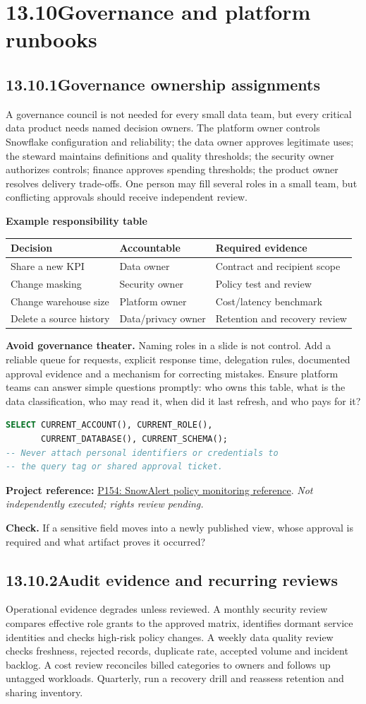\documentclass[11pt,twoside]{article}
\newcommand{\topic}[2]{\subsection*{#1\quad #2}}
\newcommand{\repo}[2]{\par\begingroup\fontsize{8.0}{9.6}\selectfont\sffamily\color{inkgray}\textbf{Project reference:} \href{#2}{#1}. \textit{Not independently executed; rights review pending.}\par\endgroup}
\begin{document}
\section*{13.10\quad Governance and platform runbooks}
\topic{13.10.1}{Governance ownership assignments}
A governance council is not needed for every small data team, but every critical data product needs named decision owners. The platform owner controls Snowflake configuration and reliability; the data owner approves legitimate uses; the steward maintains definitions and quality thresholds; the security owner authorizes controls; finance approves spending thresholds; the product owner resolves delivery trade-offs. One person may fill several roles in a small team, but conflicting approvals should receive independent review.
\begin{whitebox}\textbf{Example responsibility table}\par
\begin{tabularx}{\linewidth}{>{\raggedright\arraybackslash}X>{\raggedright\arraybackslash}X>{\raggedright\arraybackslash}X}
\toprule
Decision & Accountable & Required evidence \\
\midrule
Share a new KPI & Data owner & Contract and recipient scope \\
Change masking & Security owner & Policy test and review \\
Change warehouse size & Platform owner & Cost/latency benchmark \\
Delete a source history & Data/privacy owner & Retention and recovery review \\
\bottomrule
\end{tabularx}
\end{whitebox}
\textbf{Avoid governance theater.} Naming roles in a slide is not control. Add a reliable queue for requests, explicit response time, delegation rules, documented approval evidence and a mechanism for correcting mistakes. Ensure platform teams can answer simple questions promptly: who owns this table, what is the data classification, who may read it, when did it last refresh, and who pays for it?
\begin{lstlisting}[language=SQL,caption={A neutral context probe for a governed change request.}]
SELECT CURRENT_ACCOUNT(), CURRENT_ROLE(),
       CURRENT_DATABASE(), CURRENT_SCHEMA();
-- Never attach personal identifiers or credentials to
-- the query tag or shared approval ticket.
\end{lstlisting}
\repo{P154: SnowAlert policy monitoring reference}{https://github.com/snowflakedb/SnowAlert}
\textbf{Check.} If a sensitive field moves into a newly published view, whose approval is required and what artifact proves it occurred?
\newpage
\topic{13.10.2}{Audit evidence and recurring reviews}
Operational evidence degrades unless reviewed. A monthly security review compares effective role grants to the approved matrix, identifies dormant service identities and checks high-risk policy changes. A weekly data quality review checks freshness, rejected records, duplicate rate, accepted volume and incident backlog. A cost review reconciles billed categories to owners and follows up untagged workloads. Quarterly, run a recovery drill and reassess retention and sharing inventory.
\end{document}
